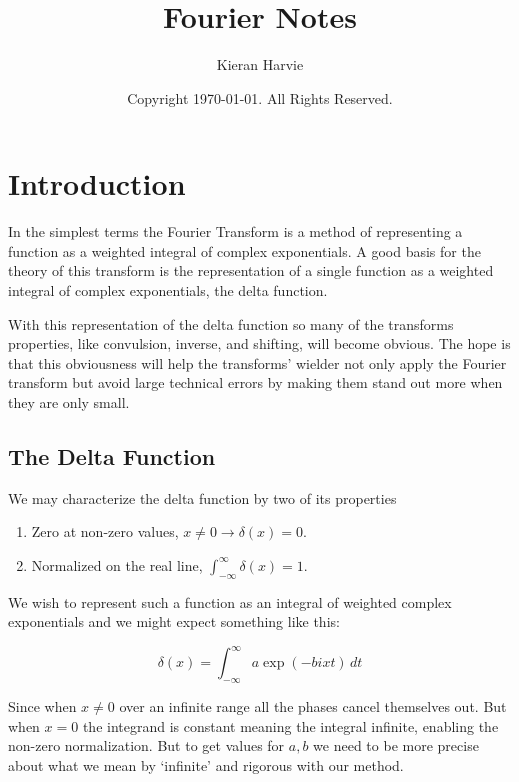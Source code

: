 \documentclass[12pt]{report}
\title{Fourier Notes}
\date{Copyright \textcopyright  \today. All Rights Reserved.}
\author{Kieran Harvie}
\begin{document}
\maketitle
\tableofcontents

\chapter{Introduction}
In the simplest terms the Fourier Transform is a method of representing a function as a weighted integral of complex exponentials.
A good basis for the theory of this transform is the representation of a single function as a weighted integral of complex exponentials, the delta function.

With this representation of the delta function so many of the transforms properties, like convulsion, inverse, and shifting, will become obvious.
The hope is that this obviousness will help the transforms' wielder not only apply the Fourier transform but avoid large technical errors by making them stand out more when they are only small.

\section{The Delta Function}
We may characterize the delta function by two of its properties
\begin{enumerate}
\item Zero at non-zero values, $x\neq 0 \rightarrow \delta(x) = 0$.
\item Normalized on the real line, $\int_{-\infty}^{\infty}\delta(x) = 1$.
\end{enumerate}

We wish to represent such a function as an integral of weighted complex exponentials and we might expect something like this:

\[\delta(x) = \int_{-\infty}^{\infty}a\exp(-bixt)\,dt\]

Since when $x\neq 0$ over an infinite range all the phases cancel themselves out.
But when $x=0$ the integrand is constant meaning the integral infinite, enabling the non-zero normalization.
But to get values for $a,b$ we need to be more precise about what we mean by `infinite' and rigorous with our method.
\\
\end{document}
